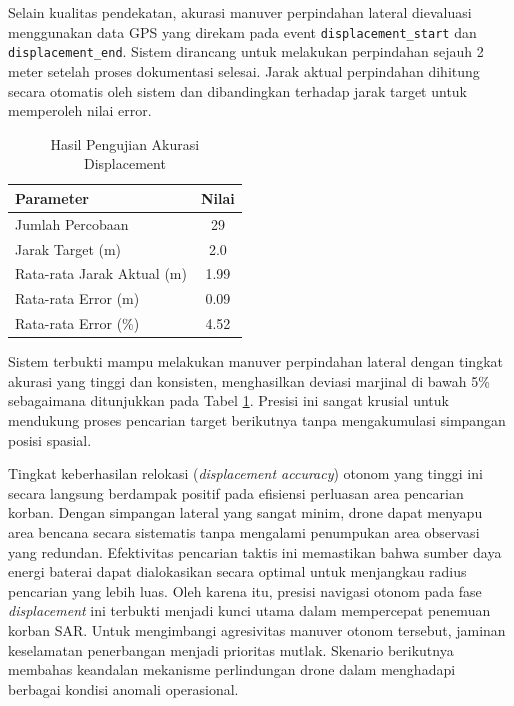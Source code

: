 Selain kualitas pendekatan, akurasi manuver perpindahan lateral dievaluasi menggunakan data GPS yang direkam pada event \texttt{displacement\_start} dan \texttt{displacement\_end}. Sistem dirancang untuk melakukan perpindahan sejauh 2 meter setelah proses dokumentasi selesai. Jarak aktual perpindahan dihitung secara otomatis oleh sistem dan dibandingkan terhadap jarak target untuk memperoleh nilai error.

\begin{table}[H]
	\centering
	\caption{Hasil Pengujian Akurasi Displacement}
	\label{tab:displacement_accuracy}
	\renewcommand{\arraystretch}{1.2}
	\begin{tabular}{|l|c|}
		\hline
		\textbf{Parameter} & \textbf{Nilai} \\ \hline
		Jumlah Percobaan & 29 \\ \hline
		Jarak Target (m) & 2.0 \\ \hline
		Rata-rata Jarak Aktual (m) & 1.99 \\ \hline
		Rata-rata Error (m) & 0.09 \\ \hline
		Rata-rata Error (\%) & 4.52 \\ \hline
	\end{tabular}
\end{table}

Sistem terbukti mampu melakukan manuver perpindahan lateral dengan tingkat akurasi yang tinggi dan konsisten, menghasilkan deviasi marjinal di bawah 5\% sebagaimana ditunjukkan pada Tabel \ref{tab:displacement_accuracy}. Presisi ini sangat krusial untuk mendukung proses pencarian target berikutnya tanpa mengakumulasi simpangan posisi spasial.

Tingkat keberhasilan relokasi (\textit{displacement accuracy}) otonom yang tinggi ini secara langsung berdampak positif pada efisiensi perluasan area pencarian korban. Dengan simpangan lateral yang sangat minim, drone dapat menyapu area bencana secara sistematis tanpa mengalami penumpukan area observasi yang redundan. Efektivitas pencarian taktis ini memastikan bahwa sumber daya energi baterai dapat dialokasikan secara optimal untuk menjangkau radius pencarian yang lebih luas. Oleh karena itu, presisi navigasi otonom pada fase \textit{displacement} ini terbukti menjadi kunci utama dalam mempercepat penemuan korban SAR. Untuk mengimbangi agresivitas manuver otonom tersebut, jaminan keselamatan penerbangan menjadi prioritas mutlak. Skenario berikutnya membahas keandalan mekanisme perlindungan drone dalam menghadapi berbagai kondisi anomali operasional.

